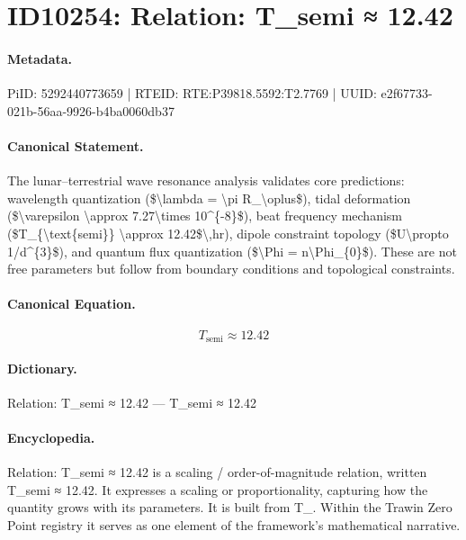 \section*{ID10254: Relation: T\_semi ≈ 12.42}
\paragraph{Metadata.}
PiID: 5292440773659 | RTEID: RTE:P39818.5592:T2.7769 | UUID: e2f67733-021b-56aa-9926-b4ba0060db37

\paragraph{Canonical Statement.}
The lunar–terrestrial wave resonance analysis validates core predictions: wavelength quantization (\$\textbackslash{}lambda = \textbackslash{}pi R\_\textbackslash{}oplus\$), tidal deformation (\$\textbackslash{}varepsilon \textbackslash{}approx 7.27\textbackslash{}times 10\textasciicircum{}\{-8\}\$), beat frequency mechanism (\$T\_\{\textbackslash{}text\{semi\}\} \textbackslash{}approx 12.42\$\textbackslash{},hr), dipole constraint topology (\$U\textbackslash{}propto 1/d\textasciicircum{}\{3\}\$), and quantum flux quantization (\$\textbackslash{}Phi = n\textbackslash{}Phi\_\{0\}\$). These are not free parameters but follow from boundary conditions and topological constraints.

\paragraph{Canonical Equation.}
\[
T_{\text{semi}} \approx 12.42
\]

\paragraph{Dictionary.}
Relation: T\_semi ≈ 12.42 — T\_semi ≈ 12.42

\paragraph{Encyclopedia.}
Relation: T\_semi ≈ 12.42 is a scaling / order-of-magnitude relation, written T\_semi ≈ 12.42. It expresses a scaling or proportionality, capturing how the quantity grows with its parameters. It is built from T\_. Within the Trawin Zero Point registry it serves as one element of the framework's mathematical narrative.

